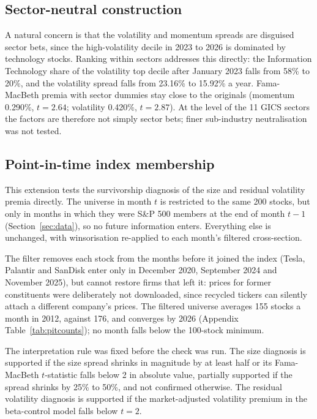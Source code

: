 \documentclass[11pt,a4paper]{article}
\begin{document}
\subsection{Sector-neutral construction}
\label{sec:sector}

A natural concern is that the volatility and momentum spreads are disguised sector bets, since the high-volatility decile in 2023 to 2026 is dominated by technology stocks. Ranking within sectors addresses this directly: the Information Technology share of the volatility top decile after January 2023 falls from 58\% to 20\%, and the volatility spread falls from 23.16\% to 15.92\% a year. Fama-MacBeth premia with sector dummies stay close to the originals (momentum 0.290\%, $t = 2.64$; volatility 0.420\%, $t = 2.87$). At the level of the 11 GICS sectors the factors are therefore not simply sector bets; finer sub-industry neutralisation was not tested.

\subsection{Point-in-time index membership}
\label{sec:pit}

This extension tests the survivorship diagnosis of the size and residual volatility premia directly. The universe in month $t$ is restricted to the same 200 stocks, but only in months in which they were S\&P 500 members at the end of month $t-1$ (Section~\ref{sec:data}), so no future information enters. Everything else is unchanged, with winsorisation re-applied to each month's filtered cross-section.

The filter removes each stock from the months before it joined the index (Tesla, Palantir and SanDisk enter only in December 2020, September 2024 and November 2025), but cannot restore firms that left it: prices for former constituents were deliberately not downloaded, since recycled tickers can silently attach a different company's prices. The filtered universe averages 155 stocks a month in 2012, against 176, and converges by 2026 (Appendix Table~\ref{tab:pitcounts}); no month falls below the 100-stock minimum.

The interpretation rule was fixed before the check was run. The size diagnosis is supported if the size spread shrinks in magnitude by at least half or its Fama-MacBeth $t$-statistic falls below 2 in absolute value, partially supported if the spread shrinks by 25\% to 50\%, and not confirmed otherwise. The residual volatility diagnosis is supported if the market-adjusted volatility premium in the beta-control model falls below $t = 2$.
\end{document}
